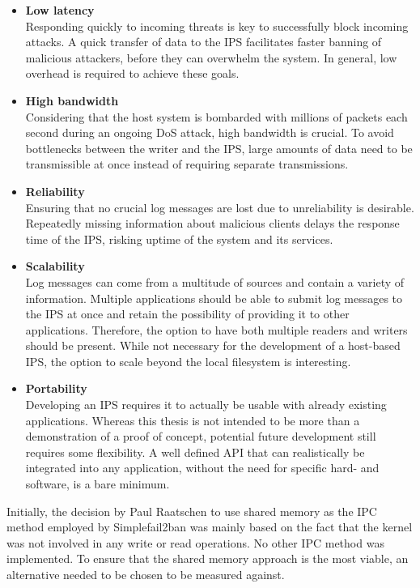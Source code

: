 \begin{itemize}
    \item \textbf{Low latency} \\
        Responding quickly to incoming threats is key to successfully block incoming attacks.
        A quick transfer of data to the \ac{IPS} facilitates faster banning of malicious attackers, before they can overwhelm the system.
        In general, low overhead is required to achieve these goals.
    \item \textbf{High bandwidth} \\
        Considering that the host system is bombarded with millions of packets each second during an ongoing \ac{DoS} attack, high bandwidth is crucial.
        To avoid bottlenecks between the writer and the \ac{IPS}, large amounts of data need to be transmissible at once instead of requiring separate transmissions.
    \item \textbf{Reliability} \\
        Ensuring that no crucial log messages are lost due to unreliability is desirable.
        Repeatedly missing information about malicious clients delays the response time of the \ac{IPS}, risking uptime of the system and its services.
    \item \textbf{Scalability} \\
        Log messages can come from a multitude of sources and contain a variety of information.
        Multiple applications should be able to submit log messages to the \ac{IPS} at once and retain the possibility of providing it to other applications.
        Therefore, the option to have both multiple readers and writers should be present.
        While not necessary for the development of a host-based \ac{IPS}, the option to scale beyond the local filesystem is interesting.
    \item \textbf{Portability} \\
        Developing an \ac{IPS} requires it to actually be usable with already existing applications.
        Whereas this thesis is not intended to be more than a demonstration of a proof of concept, potential future development still requires some flexibility.
        A well defined \ac{API} that can realistically be integrated into any application, without the need for specific hard- and software, is a bare minimum.
\end{itemize}

Initially, the decision by Paul Raatschen to use shared memory as the \ac{IPC} method employed by Simplefail2ban was mainly based on the fact that the kernel was not involved in any write or read operations\cite{raatschen:ipc}.
No other \ac{IPC} method was implemented.
To ensure that the shared memory approach is the most viable, an alternative needed to be chosen to be measured against.

